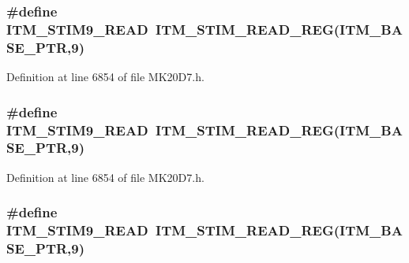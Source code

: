 \subsubsection[{\texorpdfstring{I\+T\+M\+\_\+\+S\+T\+I\+M9\+\_\+\+R\+E\+AD}{ITM_STIM9_READ}}]{\setlength{\rightskip}{0pt plus 5cm}\#define I\+T\+M\+\_\+\+S\+T\+I\+M9\+\_\+\+R\+E\+AD~{\bf I\+T\+M\+\_\+\+S\+T\+I\+M\+\_\+\+R\+E\+A\+D\+\_\+\+R\+EG}({\bf I\+T\+M\+\_\+\+B\+A\+S\+E\+\_\+\+P\+TR},9)}\hypertarget{group___i_t_m___register___accessor___macros_ga1c080ae3f53ea5063b86fd6fe6ba264d}{}\label{group___i_t_m___register___accessor___macros_ga1c080ae3f53ea5063b86fd6fe6ba264d}


Definition at line 6854 of file M\+K20\+D7.\+h.

\subsubsection[{\texorpdfstring{I\+T\+M\+\_\+\+S\+T\+I\+M9\+\_\+\+R\+E\+AD}{ITM_STIM9_READ}}]{\setlength{\rightskip}{0pt plus 5cm}\#define I\+T\+M\+\_\+\+S\+T\+I\+M9\+\_\+\+R\+E\+AD~{\bf I\+T\+M\+\_\+\+S\+T\+I\+M\+\_\+\+R\+E\+A\+D\+\_\+\+R\+EG}({\bf I\+T\+M\+\_\+\+B\+A\+S\+E\+\_\+\+P\+TR},9)}\hypertarget{group___i_t_m___register___accessor___macros_ga1c080ae3f53ea5063b86fd6fe6ba264d}{}\label{group___i_t_m___register___accessor___macros_ga1c080ae3f53ea5063b86fd6fe6ba264d}


Definition at line 6854 of file M\+K20\+D7.\+h.

\subsubsection[{\texorpdfstring{I\+T\+M\+\_\+\+S\+T\+I\+M9\+\_\+\+R\+E\+AD}{ITM_STIM9_READ}}]{\setlength{\rightskip}{0pt plus 5cm}\#define I\+T\+M\+\_\+\+S\+T\+I\+M9\+\_\+\+R\+E\+AD~{\bf I\+T\+M\+\_\+\+S\+T\+I\+M\+\_\+\+R\+E\+A\+D\+\_\+\+R\+EG}({\bf I\+T\+M\+\_\+\+B\+A\+S\+E\+\_\+\+P\+TR},9)}\hypertarget{group___i_t_m___register___accessor___macros_ga1c080ae3f53ea5063b86fd6fe6ba264d}{}\label{group___i_t_m___register___accessor___macros_ga1c080ae3f53ea5063b86fd6fe6ba264d}


